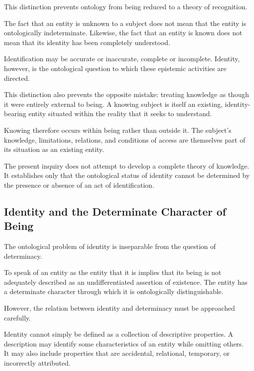 This distinction prevents ontology from being reduced
to a theory of recognition.

The fact that an entity is unknown to a subject does not
mean that the entity is ontologically indeterminate.
Likewise, the fact that an entity is known does not mean
that its identity has been completely understood.

Identification may be accurate or inaccurate, complete
or incomplete. Identity, however, is the ontological
question to which these epistemic activities are
directed.

This distinction also prevents the opposite mistake:
treating knowledge as though it were entirely external
to being. A knowing subject is itself an existing,
identity-bearing entity situated within the reality
that it seeks to understand.

Knowing therefore occurs within being rather than
outside it. The subject's knowledge, limitations,
relations, and conditions of access are themselves
part of its situation as an existing entity.

The present inquiry does not attempt to develop a
complete theory of knowledge. It establishes only
that the ontological status of identity cannot be
determined by the presence or absence of an act of
identification.



\subsection{Identity and the Determinate Character of Being}
\label{subsec:identity-and-determinate-being}

The ontological problem of identity is inseparable from
the question of determinacy.

To speak of an entity as the entity that it is implies
that its being is not adequately described as an
undifferentiated assertion of existence. The entity
has a determinate character through which it is
ontologically distinguishable.

However, the relation between identity and determinacy
must be approached carefully.

Identity cannot simply be defined as a collection of
descriptive properties. A description may identify
some characteristics of an entity while omitting
others. It may also include properties that are
accidental, relational, temporary, or incorrectly
attributed.

